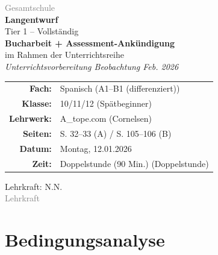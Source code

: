 \documentclass[11pt,a4paper]{article}
\newcommand{\fach}{Spanisch}
\newcommand{\jahrgangsstufe}{10/11/12 (Spätbeginner)}
\newcommand{\schulart}{Gesamtschule}
\newcommand{\stundenthema}{Bucharbeit + Assessment-Ankündigung}
\newcommand{\reihenthema}{Unterrichtsvorbereitung Beobachtung Feb. 2026}
\newcommand{\unterrichtsdatum}{12.01.2026}
\newcommand{\unterrichtszeit}{Doppelstunde (90 Min.)}
\newcommand{\lehrkraft}{N.N.}
\newcommand{\ausbildungsstand}{Lehrkraft}
\newcommand{\gerniveau}{A1--B1 (differenziert)}
\newcommand{\lehrwerk}{A\_tope.com (Cornelsen)}
\newcommand{\lehrwerkseite}{S. 32--33 (A) / S. 105--106 (B)}
\begin{document}
\begin{titlepage}
    \centering
    \vspace*{2cm}

    {\large\textcolor{gray}{\schulart}}\\[2cm]

    {\Huge\textcolor{fach}{\textbf{Langentwurf}}}\\[0.5cm]
    {\large Tier 1 -- Vollständig}\\[2cm]

    {\LARGE\textbf{\stundenthema}}\\[0.5cm]
    {\large im Rahmen der Unterrichtsreihe}\\[0.3cm]
    {\Large\textit{\reihenthema}}\\[2cm]

    \begin{tabular}{rl}
        \textbf{Fach:} & \fach{} (\gerniveau) \\[0.3cm]
        \textbf{Klasse:} & \jahrgangsstufe \\[0.3cm]
        \textbf{Lehrwerk:} & \lehrwerk \\[0.3cm]
        \textbf{Seiten:} & \lehrwerkseite \\[0.3cm]
        \textbf{Datum:} & Montag, \unterrichtsdatum \\[0.3cm]
        \textbf{Zeit:} & \unterrichtszeit{} (Doppelstunde) \\[0.3cm]
    \end{tabular}

    \vfill

    {\large Lehrkraft: \lehrkraft}\\[0.3cm]
    {\normalsize\textcolor{gray}{\ausbildungsstand}}\\[1cm]

\end{titlepage}

\tableofcontents
\newpage

\section{Bedingungsanalyse}
\end{document}
